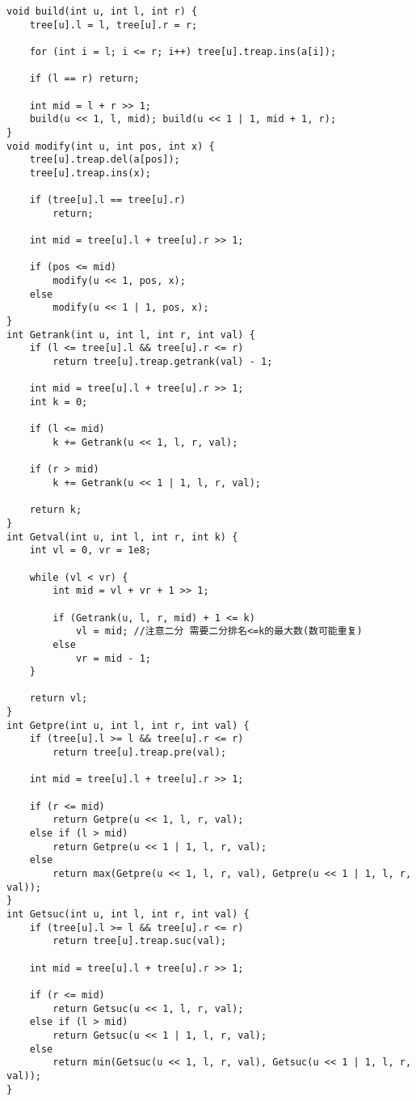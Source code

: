 \begin{verbatim}
void build(int u, int l, int r) {
    tree[u].l = l, tree[u].r = r;

    for (int i = l; i <= r; i++) tree[u].treap.ins(a[i]);

    if (l == r) return;

    int mid = l + r >> 1;
    build(u << 1, l, mid); build(u << 1 | 1, mid + 1, r);
}
void modify(int u, int pos, int x) {
    tree[u].treap.del(a[pos]);
    tree[u].treap.ins(x);

    if (tree[u].l == tree[u].r)
        return;

    int mid = tree[u].l + tree[u].r >> 1;

    if (pos <= mid)
        modify(u << 1, pos, x);
    else
        modify(u << 1 | 1, pos, x);
}
int Getrank(int u, int l, int r, int val) {
    if (l <= tree[u].l && tree[u].r <= r)
        return tree[u].treap.getrank(val) - 1;

    int mid = tree[u].l + tree[u].r >> 1;
    int k = 0;

    if (l <= mid)
        k += Getrank(u << 1, l, r, val);

    if (r > mid)
        k += Getrank(u << 1 | 1, l, r, val);

    return k;
}
int Getval(int u, int l, int r, int k) {
    int vl = 0, vr = 1e8;

    while (vl < vr) {
        int mid = vl + vr + 1 >> 1;

        if (Getrank(u, l, r, mid) + 1 <= k)
            vl = mid; //注意二分 需要二分排名<=k的最大数(数可能重复)
        else
            vr = mid - 1;
    }

    return vl;
}
int Getpre(int u, int l, int r, int val) {
    if (tree[u].l >= l && tree[u].r <= r)
        return tree[u].treap.pre(val);

    int mid = tree[u].l + tree[u].r >> 1;

    if (r <= mid)
        return Getpre(u << 1, l, r, val);
    else if (l > mid)
        return Getpre(u << 1 | 1, l, r, val);
    else
        return max(Getpre(u << 1, l, r, val), Getpre(u << 1 | 1, l, r, val));
}
int Getsuc(int u, int l, int r, int val) {
    if (tree[u].l >= l && tree[u].r <= r)
        return tree[u].treap.suc(val);

    int mid = tree[u].l + tree[u].r >> 1;

    if (r <= mid)
        return Getsuc(u << 1, l, r, val);
    else if (l > mid)
        return Getsuc(u << 1 | 1, l, r, val);
    else
        return min(Getsuc(u << 1, l, r, val), Getsuc(u << 1 | 1, l, r, val));
}


\end{verbatim}
